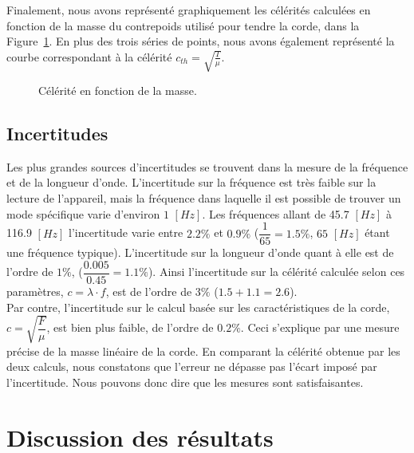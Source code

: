 \documentclass[11pt]{article}
\begin{document}
    Finalement, nous avons représenté graphiquement les célérités calculées en fonction de la masse du contrepoids
    utilisé pour tendre la corde, dans la Figure~\ref{fig:lambda}.
    En plus des trois séries de points, nous avons également représenté la courbe correspondant à la célérité
    $c_{th} = \sqrt{\frac{T}{\mu}}$.

    \begin{figure}[H]
        \centering
        
        \caption{Célérité en fonction de la masse.}
        \label{fig:lambda}
    \end{figure}

    \subsection{Incertitudes}

    Les plus grandes sources d'incertitudes se trouvent dans la mesure de la fréquence et de la longueur d'onde.
    L'incertitude sur la fréquence est très faible sur la lecture de l'appareil, mais la fréquence dans laquelle
    il est possible de trouver un mode spécifique varie d'environ $1$ $[Hz]$.
    Les fréquences allant de 45.7 $[Hz]$ à 116.9 $[Hz]$ l'incertitude varie entre $2.2\%$ et
    $0.9\%$ ($\dfrac{1}{65}=1.5\%$, $65$ $[Hz]$ étant une fréquence typique).
    L'incertitude sur la longueur d'onde quant à elle est de l'ordre de $1\%$, ($\dfrac{0.005}{0.45}=1.1\%$).
    Ainsi l'incertitude sur la célérité calculée selon ces paramètres,  $c=\lambda \cdot f$, est de l'ordre de
    $3\%$ ($1.5+1.1=2.6$).\\ Par contre, l'incertitude sur le calcul basée sur les caractéristiques de la corde,
    $c=\sqrt{\dfrac{F}{\mu}}$, est bien plus faible, de l'ordre de $0.2\%$.
    Ceci s'explique par une mesure précise de la masse linéaire de la corde.
    En comparant la célérité obtenue par les deux calculs, nous constatons que l'erreur ne dépasse pas l'écart
    imposé par l'incertitude.
    Nous pouvons donc dire que les mesures sont satisfaisantes.

    \section{Discussion des résultats}\label{sec:discussion-des-resultats}
\end{document}
